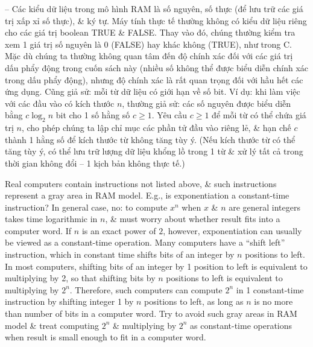 \documentclass{article}
\begin{document}
\begin{itemize}
\begin{itemize}
\begin{itemize}
            --  Các kiểu dữ liệu trong mô hình RAM là số nguyên, số thực (để lưu trữ các giá trị xấp xỉ số thực), \& ký tự. Máy tính thực tế thường không có kiểu dữ liệu riêng cho các giá trị boolean TRUE \& FALSE. Thay vào đó, chúng thường kiểm tra xem 1 giá trị số nguyên là 0 (FALSE) hay khác không (TRUE), như trong C. Mặc dù chúng ta thường không quan tâm đến độ chính xác đối với các giá trị dấu phẩy động trong cuốn sách này (nhiều số không thể được biểu diễn chính xác trong dấu phẩy động), nhưng độ chính xác là rất quan trọng đối với hầu hết các ứng dụng. Cũng giả sử: mỗi từ dữ liệu có giới hạn về số bit. Ví dụ: khi làm việc với các đầu vào có kích thước $n$, thường giả sử: các số nguyên được biểu diễn bằng $c\log_2n$ bit cho 1 số hằng số $c\ge1$. Yêu cầu $c\ge1$ để mỗi từ có thể chứa giá trị $n$, cho phép chúng ta lập chỉ mục các phần tử đầu vào riêng lẻ, \& hạn chế $c$ thành 1 hằng số để kích thước từ không tăng tùy ý. (Nếu kích thước từ có thể tăng tùy ý, có thể lưu trữ lượng dữ liệu khổng lồ trong 1 từ \& xử lý tất cả trong thời gian không đổi -- 1 kịch bản không thực tế.)
            
            Real computers contain instructions not listed above, \& such instructions represent a gray area in RAM model. E.g., is exponentiation a constant-time instruction? In general case, no: to compute $x^n$ when $x$ \& $n$ are general integers takes time logarithmic in $n$, \& must worry about whether result fits into a computer word. If $n$ is an exact power of $2$, however, exponentiation can usually be viewed as a constant-time operation. Many computers have a ``shift left'' instruction, which in constant time shifts bits of an integer by $n$ positions to left. In most computers, shifting bits of an integer by 1 position to left is equivalent to multiplying by 2, so that shifting bits by $n$ positions to left is equivalent to multiplying by $2^n$. Therefore, such computers can compute $2^n$ in 1 constant-time instruction by shifting integer 1 by $n$ positions to left, as long as $n$ is no more than number of bits in a computer word. Try to avoid such gray areas in RAM model \& treat computing $2^n$ \& multiplying by $2^n$ as constant-time operations when result is small enough to fit in a computer word.
            

\end{itemize}
\end{itemize}
\end{itemize}
\end{document}
